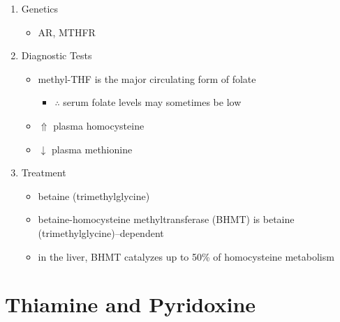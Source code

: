 \documentclass{scrartcl}
\begin{document}
\begin{enumerate}
\item Genetics
\label{sec:orge6ae1c3}
\begin{itemize}
\item AR, MTHFR
\end{itemize}

\item Diagnostic Tests
\label{sec:orga86ccc0}
\begin{itemize}
\item methyl-THF is the major circulating form of folate
\begin{itemize}
\item \(\therefore\) serum folate levels may sometimes be low
\end{itemize}
\item \(\Uparrow\) plasma homocysteine
\item \(\downarrow\) plasma methionine
\end{itemize}

\item Treatment
\label{sec:org984e12a}
\begin{itemize}
\item betaine (trimethylglycine)
\item betaine-homocysteine methyltransferase (BHMT) is betaine
(trimethylglycine)–dependent
\end{itemize}
\begin{itemize}
\item in the liver, BHMT catalyzes up to 50\% of homocysteine metabolism
\end{itemize}
\end{enumerate}

\section{Thiamine and Pyridoxine}
\label{sec:orgb59518f}
\end{document}
